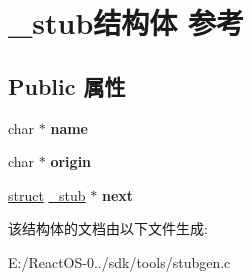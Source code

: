 \hypertarget{struct__stub}{}\section{\+\_\+stub结构体 参考}
\label{struct__stub}
\subsection*{Public 属性}
\begin{DoxyCompactItemize}
\item 
\mbox{\label{struct__stub_adce0be3b90e258961c862dbe47cce35b}} 
char $\ast$ {\bfseries name}
\item 
\mbox{\label{struct__stub_a9c4b4f31e4c6aaca23e38fe74921c5a3}} 
char $\ast$ {\bfseries origin}
\item 
\mbox{\label{struct__stub_a60ca59753bcded768fe93eb0e013fa13}} 
\hyperlink{interfacestruct}{struct} \hyperlink{struct__stub}{\+\_\+stub} $\ast$ {\bfseries next}
\end{DoxyCompactItemize}


该结构体的文档由以下文件生成\+:\begin{DoxyCompactItemize}
\item 
E\+:/\+React\+O\+S-\/0../sdk/tools/stubgen.\+c\end{DoxyCompactItemize}
